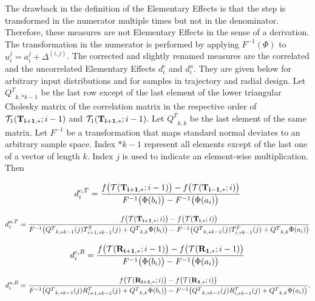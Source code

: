 \documentclass[a4paper,12pt]{article}
\begin{document}
The drawback in the definition of the Elementary Effects is that the step is transformed in the numerator multiple times but not in the denominator. Therefore, these measures are not Elementary Effects in the sense of a derivation. The transformation in the numerator is performed by applying $F^{-1}(\Phi)$ to $u_i^j = a_i^j + \Delta^{(i,j)}$. The corrected and slightly renamed measures are the correlated and the uncorrelated Elementary Effects $d_i^{c}$ and $d_i^{u}$. They are given below for arbitrary input distributions and for samples in trajectory and radial design. Let ${Q^T}_{k,*k-1}$ be the last row except of the last element of the lower triangular Cholesky matrix of the correlation matrix in the respective order of $\mathcal{T}_1(\bold{T_{i+1,*}}; i-1)$ and $\mathcal{T}_1(\bold{T_{i+1,*}}; i-1)$. Let ${Q^T}_{k,k}$ be the last element of the same matrix. Let $F^{-1}$ be a transformation that maps standard normal deviates to an arbitrary sample space. Index $*k-1$ represent all elements except of the last one of a vector of length $k$. Index $j$ is used to indicate an element-wise multiplication. Then

\begin{align}
d_i^{c,T} = \frac{f\big(\mathcal{T}(\bold{T_{i+1,*}}; i-1)\big) - f\big(\mathcal{T}(\bold{T_{i-1,*}}; i)\big)}{F^{-1}\big(\Phi(b_i)\big) - F^{-1}\big( \Phi(a_i)\big)}
\end{align}

\begin{align}
d_i^{u, T} = \frac{f\big(\mathcal{T}(\bold{T_{i+1,*}}; i)\big) - f\big(\mathcal{T}(\bold{T_{i,*}}; i)\big)}{F^{-1}\big({Q^T}_{k,*k-1}(j)T_{i+1,*k-1}^T(j) + {Q^T}_{k,k} \Phi(b_i)\big) - F^{-1}\big({Q^T}_{k,*k-1}(j)T_{i,*k-1}^T(j)+{Q^T}_{k,k} \Phi(a_i)\big)}
\end{align}

\begin{align}
d_i^{c, R} = \frac{f\big(\mathcal{T}(\bold{R_{i+1,*}}; i-1)\big) - f\big(\mathcal{T}(\bold{R_{1,*}}; i-1)\big)}{F^{-1}\big( \Phi(b_i)\big) - F^{-1}\big( \Phi(a_i)\big)}
\end{align}

\begin{align}
d_i^{u, R} = \frac{f\big(\mathcal{T}(\bold{R_{i+1,*}}; i)\big) - f\big(\mathcal{T}(\bold{R_{1,*}}; i)\big)}{F^{-1}\big({Q^T}_{k,*k-1}(j)R_{i+1,*k-1}^T(j) + {Q^T}_{k,k} \Phi(b_i)\big) - F^{-1}\big({Q^T}_{k,*k-1}(j)R_{i,*k-1}^T(j)+{Q^T}_{k,k} \Phi(a_i)\big)}.
\end{align}
\end{document}

